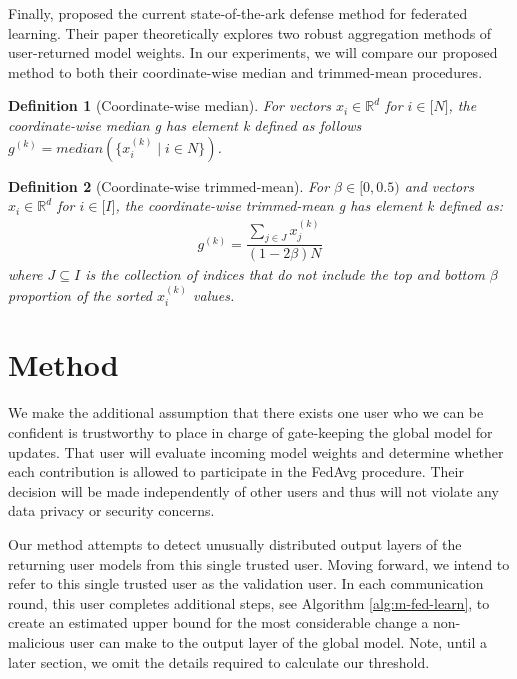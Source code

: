 \documentclass{article} %
\newtheorem{definition}{Definition}
\begin{document}
Finally, \cite{trim-mean} proposed the current state-of-the-ark defense method for federated learning. Their paper theoretically explores two robust aggregation methods of user-returned model weights. In our experiments, we will compare our proposed method to both their coordinate-wise median and trimmed-mean procedures.

\begin{definition}[Coordinate-wise median] 
For vectors $x_i \in \mathbb{R}^{d}$ for $i \in \mathopen[N\mathclose]$, the coordinate-wise median g has element k defined as follows $g^{(k)} = median(\{x_i^{(k)} \mid i \in N\})$.
\end{definition}

\begin{definition}[Coordinate-wise trimmed-mean]
For $\beta \in \mathopen[ 0, 0.5 \mathclose)$ and vectors $x_i \in \mathbb{R}^{d}$ for $i \in \mathopen[I\mathclose]$, the coordinate-wise trimmed-mean g has element k defined as:
\begin{align*}
g^{(k)} = \dfrac{\sum_{j \in J}{x_j^{(k)}}}{(1 - 2\beta)N}
\end{align*}
where $J \subseteq I$ is the collection of indices that do not include the top and bottom $\beta$ proportion of the sorted $x_i^{(k)}$ values.
\end{definition}

%
\section{Method}

We make the additional assumption that there exists one user who we can be confident is trustworthy to place in charge of gate-keeping the global model for updates. That user will evaluate incoming model weights and determine whether each contribution is allowed to participate in the FedAvg procedure. Their decision will be made independently of other users and thus will not violate any data privacy or security concerns.

Our method attempts to detect unusually distributed output layers of the returning user models from this single trusted user. Moving forward, we intend to refer to this single trusted user as the validation user. In each communication round, this user completes additional steps, see Algorithm \ref{alg:m-fed-learn}, to create an estimated upper bound for the most considerable change a non-malicious user can make to the output layer of the global model. Note, until a later section, we omit the details required to calculate our threshold.
\end{document}
